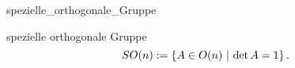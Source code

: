 \documentclass[class=article, crop=false]{standalone}
\begin{document}
\begin{zettel}{spezielle_orthogonale_Gruppe}
\begin{flashcard}[zhvvla61]{spezielle orthogonale Gruppe}
	\[
		SO (n):= \set{A \in  O (n)}{\det A =1}
	.\]
\end{flashcard}
\end{zettel}
\end{document}
